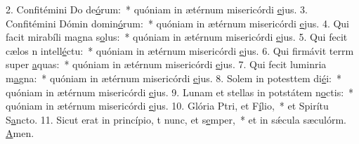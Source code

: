2. Confitémini Do de\uline{ó}rum:~* quóniam in ætérnum misericórdi \uline{e}jus.
3. Confitémini Dómin domin\uline{ó}rum:~* quóniam in ætérnum misericórdi \uline{e}jus.
4. Qui facit mirabíli magna s\uline{o}lus:~* quóniam in ætérnum misericórdi \uline{e}jus.
5. Qui fecit cælos n intell\uline{é}ctu:~* quóniam in ætérnum misericórdi \uline{e}jus.
6. Qui firmávit terrm super \uline{a}quas:~* quóniam in ætérnum misericórdi \uline{e}jus.
7. Qui fecit luminria m\uline{a}gna:~* quóniam in ætérnum misericórdi \uline{e}jus.
8. Solem in potesttem di\uline{é}i:~* quóniam in ætérnum misericórdi \uline{e}jus.
9. Lunam et stellas in potstátem n\uline{o}ctis:~* quóniam in ætérnum misericórdi \uline{e}jus.
10. Glória Ptri, et F\uline{í}lio,~* et Spirítu S\uline{a}ncto.
11. Sicut erat in princípio, t nunc, et s\uline{e}mper,~* et in sǽcula sæculórm. \uline{A}men.
